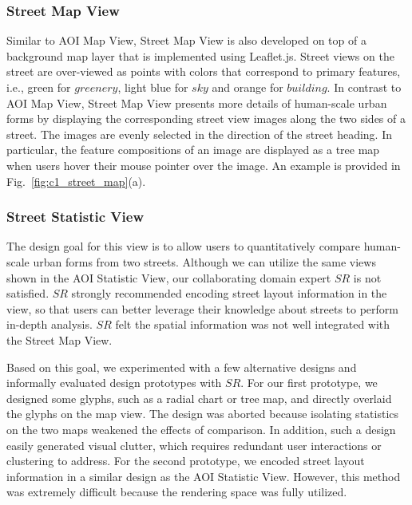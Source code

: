 \subsubsection{Street Map View}
\label{sssec:c1_street_view}

Similar to AOI Map View, Street Map View is also developed on top of a background map layer that is implemented using Leaflet.js.
Street views on the street are over-viewed as points with colors that correspond to primary features, i.e., green for $greenery$, light blue for $sky$ and orange for $building$.
In contrast to AOI Map View, Street Map View presents more details of human-scale urban forms by displaying the corresponding street view images along the two sides of a street.
The images are evenly selected in the direction of the street heading. 
In particular, the feature compositions of an image are displayed as a tree map~\cite{shneiderman_1992_tree} when users hover their mouse pointer over the image.
An example is provided in Fig.~\ref{fig:c1_street_map}(a).


\subsubsection{Street Statistic View}
\label{sssec:c1_street_stat_view}

The design goal for this view is to allow users to quantitatively compare human-scale urban forms from two streets.
Although we can utilize the same views shown in the AOI Statistic View, our collaborating domain expert $SR$ is not satisfied.
$SR$ strongly recommended encoding street layout information in the view, so that users can better leverage their knowledge about streets to perform in-depth analysis.
$SR$ felt the spatial information was not well integrated with the Street Map View.

Based on this goal, we experimented with a few alternative designs and informally evaluated design prototypes with $SR$.
For our first prototype, we designed some glyphs, such as a radial chart or tree map, and directly overlaid the glyphs on the map view.
The design was aborted because isolating statistics on the two maps weakened the effects of comparison.
In addition, such a design easily generated visual clutter, which requires redundant user interactions or clustering to address.
For the second prototype, we encoded street layout information in a similar design as the AOI Statistic View.
However, this method was extremely difficult because the rendering space was fully utilized. 

